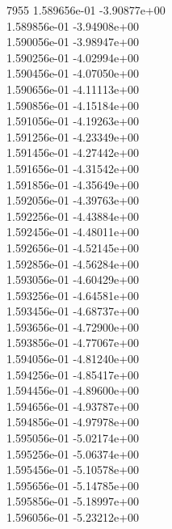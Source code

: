 7955	1.589656e-01	-3.90877e+00	\\ 	1.589856e-01	-3.94908e+00	\\ 	1.590056e-01	-3.98947e+00	\\ 	1.590256e-01	-4.02994e+00	\\ 	1.590456e-01	-4.07050e+00	\\ 	1.590656e-01	-4.11113e+00	\\ 	1.590856e-01	-4.15184e+00	\\ 	1.591056e-01	-4.19263e+00	\\ 	1.591256e-01	-4.23349e+00	\\ 	1.591456e-01	-4.27442e+00	\\ 	1.591656e-01	-4.31542e+00	\\ 	1.591856e-01	-4.35649e+00	\\ 	1.592056e-01	-4.39763e+00	\\ 	1.592256e-01	-4.43884e+00	\\ 	1.592456e-01	-4.48011e+00	\\ 	1.592656e-01	-4.52145e+00	\\ 	1.592856e-01	-4.56284e+00	\\ 	1.593056e-01	-4.60429e+00	\\ 	1.593256e-01	-4.64581e+00	\\ 	1.593456e-01	-4.68737e+00	\\ 	1.593656e-01	-4.72900e+00	\\ 	1.593856e-01	-4.77067e+00	\\ 	1.594056e-01	-4.81240e+00	\\ 	1.594256e-01	-4.85417e+00	\\ 	1.594456e-01	-4.89600e+00	\\ 	1.594656e-01	-4.93787e+00	\\ 	1.594856e-01	-4.97978e+00	\\ 	1.595056e-01	-5.02174e+00	\\ 	1.595256e-01	-5.06374e+00	\\ 	1.595456e-01	-5.10578e+00	\\ 	1.595656e-01	-5.14785e+00	\\ 	1.595856e-01	-5.18997e+00	\\ 	1.596056e-01	-5.23212e+00	\\ \hline
